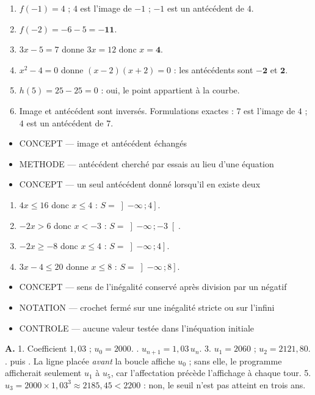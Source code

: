 \documentclass[10pt,a4paper]{article}
\begin{document}
\begin{enumerate}
\item $f(-1)=4$ ; $4$ est l'image de $-1$ ; $-1$ est un antécédent de $4$.
\item $f(-2)=-6-5=\mathbf{-11}$.
\item $3x-5=7$ donne $3x=12$ donc $x=\mathbf{4}$.
\item $x^2-4=0$ donne $(x-2)(x+2)=0$ : les antécédents sont $\mathbf{-2}$ et $\mathbf{2}$.
\item $h(5)=25-25=0$ : oui, le point appartient à la courbe.
\item Image et antécédent sont inversés. Formulations exactes : $7$ est l'image de $4$ ; $4$ est un antécédent de $7$.
\end{enumerate}
\begin{itemize}
\item \textsc{CONCEPT} --- image et antécédent échangés
\item \textsc{METHODE} --- antécédent cherché par essais au lieu d'une équation
\item \textsc{CONCEPT} --- un seul antécédent donné lorsqu'il en existe deux
\end{itemize}
\begin{enumerate}
\item $4x\le 16$ donc $x\le 4$ : $S=\left]-\infty\,;4\right]$.
\item $-2x>6$ donc $x<-3$ : $S=\left]-\infty\,;-3\right[$.
\item $-2x \ge -8$ donc $x\le 4$ : $S=\left]-\infty\,;4\right]$.
\item $3x-4\le 20$ donne $x\le 8$ : $S=\left]-\infty\,;8\right]$.
\end{enumerate}
\begin{itemize}
\item \textsc{CONCEPT} --- sens de l'inégalité conservé après division par un négatif
\item \textsc{NOTATION} --- crochet fermé sur une inégalité stricte ou sur l'infini
\item \textsc{CONTROLE} --- aucune valeur testée dans l'inéquation initiale
\end{itemize}

\textbf{A.} 1. Coefficient $1{,}03$ ; $u_0=2000$. . $u_{n+1}=1{,}03\,u_n$.
3. $u_1=2060$ ; $u_2=2121{,}80$. .  puis .
La ligne  placée \emph{avant} la boucle affiche $u_0$ ; sans elle, le programme
afficherait seulement $u_1$ à $u_5$, car l'affectation précède l'affichage à chaque tour.
5. $u_3=2000\times 1{,}03^3\approx 2185{,}45 < 2200$ : non, le seuil n'est pas atteint en trois ans.
\end{document}

